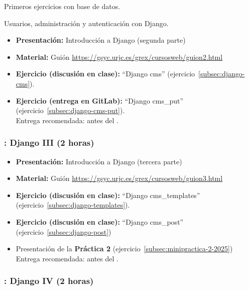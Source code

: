 \documentclass[a4paper,12pt]{article}
\begin{document}
Primeros ejercicios con base de datos.

Usuarios, administración y autenticación con Django.

\begin{itemize}
 \item \textbf{Presentación:} Introducción a Django (segunda parte)
  \item \textbf{Material:} Guión \url{https://gsyc.urjc.es/grex/cursosweb/guion2.html}
 \item \textbf{Ejercicio  (discusión en clase):} ``Django cms'' (ejercicio~\ref{subsec:django-cms}). \\
 \item \textbf{Ejercicio (entrega en GitLab):} ``Django cms\_put'' (ejercicio~\ref{subsec:django-cms-put}). \\
  Entrega recomendada: antes del \martesI.
\end{itemize}

\subsubsection{\martesI: Django III (2 horas)}
\label{cal:martesI}

\begin{itemize}
 \item \textbf{Presentación:} Introducción a Django (tercera parte)
  \item \textbf{Material:} Guión \url{https://gsyc.urjc.es/grex/cursosweb/guion3.html}
 \item \textbf{Ejercicio (discusión en clase):} ``Django cms\_templates'' (ejercicio~\ref{subsec:django-templates}).
 \item \textbf{Ejercicio (discusión en clase):} ``Django cms\_post'' (ejercicio~\ref{subsec:django-post}) \\
  \item Presentación de la \textbf{Práctica 2} (ejercicio~\ref{subsec:minipractica-2-2025}) \\
  Entrega recomendada: antes del \martesK.
\end{itemize}

\subsubsection{\martesJ: Django IV (2 horas)}
\label{cal:martesJ}
\end{document}
